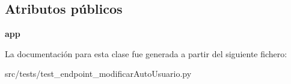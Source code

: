 \subsection*{Atributos públicos}
\begin{DoxyCompactItemize}
\item 
\hypertarget{classsrc_1_1tests_1_1test__endpoint__modificar_auto_usuario_1_1_test_endpoint_modificar_auto_usuario_a159a7f74f65e2661eae3eb55347bd3b0}{{\bfseries app}}\label{classsrc_1_1tests_1_1test__endpoint__modificar_auto_usuario_1_1_test_endpoint_modificar_auto_usuario_a159a7f74f65e2661eae3eb55347bd3b0}

\end{DoxyCompactItemize}


La documentación para esta clase fue generada a partir del siguiente fichero\-:\begin{DoxyCompactItemize}
\item 
src/tests/test\-\_\-endpoint\-\_\-modificar\-Auto\-Usuario.\-py\end{DoxyCompactItemize}
